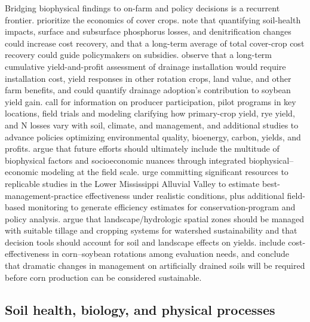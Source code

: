 Bridging biophysical findings to on-farm and policy decisions is a recurrent frontier. \textcite{Waring2020} prioritize the economics of cover crops. \textcite{Roth2018} note that quantifying soil-health impacts, surface and subsurface phosphorus losses, and denitrification changes could increase cost recovery, and that a long-term average of total cover-crop cost recovery could guide policymakers on subsidies. \textcite{Mourtzinis2021} observe that a long-term cumulative yield-and-profit assessment of drainage installation would require installation cost, yield responses in other rotation crops, land value, and other farm benefits, and could quantify drainage adoption's contribution to soybean yield gain. \textcite{Malone2023} call for information on producer participation, pilot programs in key locations, field trials and modeling clarifying how primary-crop yield, rye yield, and N losses vary with soil, climate, and management, and additional studies to advance policies optimizing environmental quality, bioenergy, carbon, yields, and profits. \textcite{Ferin2023} argue that future efforts should ultimately include the multitude of biophysical factors and socioeconomic nuances through integrated biophysical--economic modeling at the field scale. \textcite{Kröger2012} urge committing significant resources to replicable studies in the Lower Mississippi Alluvial Valley to estimate best-management-practice effectiveness under realistic conditions, plus additional field-based monitoring to generate efficiency estimates for conservation-program and policy analysis. \textcite{Bakhsh2007b} argue that landscape/hydrologic spatial zones should be managed with suitable tillage and cropping systems for watershed sustainability and that decision tools should account for soil and landscape effects on yields. \textcite{Nelson2011} include cost-effectiveness in corn--soybean rotations among evaluation needs, and \textcite{Jaynes2001} conclude that dramatic changes in management on artificially drained soils will be required before corn production can be considered sustainable.

\subsection{Soil health, biology, and physical processes}

